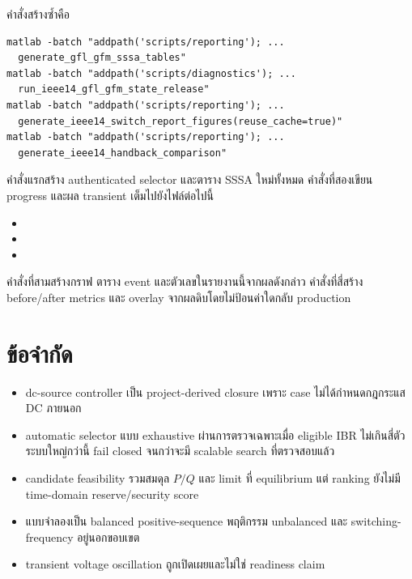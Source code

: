 \documentclass[12pt,a4paper]{article}
\begin{document}
คำสั่งสร้างซ้ำคือ
\begin{verbatim}
matlab -batch "addpath('scripts/reporting'); ...
  generate_gfl_gfm_sssa_tables"
matlab -batch "addpath('scripts/diagnostics'); ...
  run_ieee14_gfl_gfm_state_release"
matlab -batch "addpath('scripts/reporting'); ...
  generate_ieee14_switch_report_figures(reuse_cache=true)"
matlab -batch "addpath('scripts/reporting'); ...
  generate_ieee14_handback_comparison"
\end{verbatim}
คำสั่งแรกสร้าง authenticated selector และตาราง SSSA ใหม่ทั้งหมด คำสั่งที่สองเขียน progress
และผล transient เต็มไปยังไฟล์ต่อไปนี้
\begin{itemize}
\item {}
\item {}
\item {}
\end{itemize}
คำสั่งที่สามสร้างกราฟ ตาราง event และตัวเลขในรายงานนี้จากผลดังกล่าว คำสั่งที่สี่สร้าง before/after
metrics และ overlay จากผลดิบโดยไม่ป้อนค่าใดกลับ production

\section{ข้อจำกัด}

\begin{itemize}
\item dc-source controller เป็น project-derived closure เพราะ case ไม่ได้กำหนดกฎกระแส DC ภายนอก
\item automatic selector แบบ exhaustive ผ่านการตรวจเฉพาะเมื่อ eligible IBR ไม่เกินสี่ตัว ระบบใหญ่กว่านี้ fail closed
จนกว่าจะมี scalable search ที่ตรวจสอบแล้ว
\item candidate feasibility รวมสมดุล $P/Q$ และ limit ที่ equilibrium แต่ ranking ยังไม่มี time-domain reserve/security score
\item แบบจำลองเป็น balanced positive-sequence พฤติกรรม unbalanced และ switching-frequency อยู่นอกขอบเขต
\item transient voltage oscillation ถูกเปิดเผยและไม่ใช่ readiness claim
\end{itemize}
\end{document}
